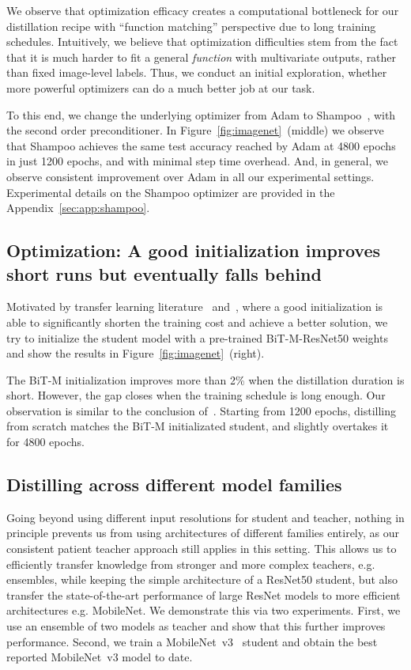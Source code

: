 \documentclass[10pt,twocolumn,letterpaper]{article}
\begin{document}
We observe that optimization efficacy creates a computational bottleneck for our distillation recipe with ``function matching'' perspective due to long training schedules. Intuitively, we believe that optimization difficulties stem from the fact that it is much harder to fit a general \emph{function} with multivariate outputs, rather than fixed image-level labels. Thus, we conduct an initial exploration, whether more powerful optimizers can do a much better job at our task.

To this end, we change the underlying optimizer from Adam to Shampoo~\cite{anil2021scalable}, with the second order preconditioner. In Figure~\ref{fig:imagenet}~(middle) we observe that Shampoo achieves the same test accuracy reached by Adam at 4800 epochs in just 1200 epochs, and with minimal step time overhead. And, in general, we observe consistent improvement over Adam in all our experimental settings. Experimental details on the Shampoo optimizer are provided in the Appendix~\ref{sec:app:shampoo}. 

\subsection{Optimization: A good initialization improves short runs but eventually falls behind}
\label{sec:limitations2}

Motivated by transfer learning literature~\cite{he2018rethinking, brain2020bit} and~\cite{shen2020mealv2}, where a good initialization is able to significantly shorten the training cost and achieve a better solution, we try to initialize the student model with a pre-trained BiT-M-ResNet50 weights and show the results in Figure~\ref{fig:imagenet}~(right).

The BiT-M initialization improves more than 2\% when the distillation duration is short.
However, the gap closes when the training schedule is long enough. 
Our observation is similar to the conclusion of~\cite{he2018rethinking}. Starting from 1200 epochs, distilling from scratch matches the BiT-M initializated student, and slightly overtakes it for 4800 epochs. 

\subsection{Distilling across different model families}

Going beyond using different input resolutions for student and teacher, nothing in principle prevents us from using architectures of different families entirely, as our consistent patient teacher approach still applies in this setting. This allows us to efficiently transfer knowledge from stronger and more complex teachers, e.g. ensembles, while keeping the simple architecture of a ResNet50 student, but also transfer the state-of-the-art performance of large ResNet models to more efficient architectures e.g. MobileNet.
We demonstrate this via two experiments.
First, we use an ensemble of two models as teacher and show that this further improves performance.
Second, we train a MobileNet~v3~\cite{howard2019searching} student and obtain the best reported MobileNet~v3 model to date.
\end{document}
